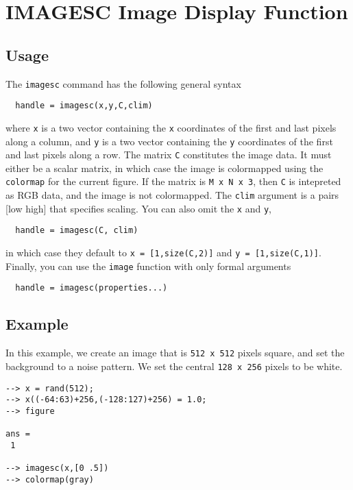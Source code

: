 \section{IMAGESC Image Display Function}

\subsection{Usage}

The \verb|imagesc| command has the following general syntax
\begin{verbatim}
  handle = imagesc(x,y,C,clim)
\end{verbatim}
where \verb|x| is a two vector containing the \verb|x| coordinates
of the first and last pixels along a column, and \verb|y| is a
two vector containing the \verb|y| coordinates of the first and
last pixels along a row.  The matrix \verb|C| constitutes the
image data.  It must either be a scalar matrix, in which case
the image is colormapped using the  \verb|colormap| for the current
figure.  If the matrix is \verb|M x N x 3|, then \verb|C| is intepreted
as RGB data, and the image is not colormapped.  The \verb|clim|
argument is a pairs [low high] that specifies scaling.  You can 
also omit the \verb|x| and \verb|y|, 
\begin{verbatim}
  handle = imagesc(C, clim)
\end{verbatim}
in which case they default to \verb|x = [1,size(C,2)]| and 
\verb|y = [1,size(C,1)]|.  Finally, you can use the \verb|image| function
with only formal arguments
\begin{verbatim}
  handle = imagesc(properties...)
\end{verbatim}

\subsection{Example}

In this example, we create an image that is \verb|512 x 512| pixels
square, and set the background to a noise pattern.  We set the central
\verb|128 x 256| pixels to be white.
\begin{verbatim}
--> x = rand(512);
--> x((-64:63)+256,(-128:127)+256) = 1.0;
--> figure

ans = 
 1 

--> imagesc(x,[0 .5])
--> colormap(gray)
\end{verbatim}

